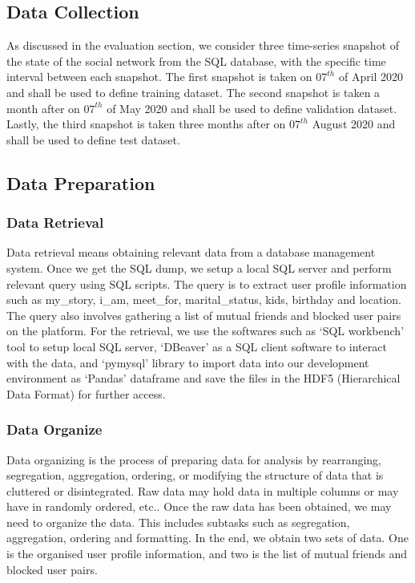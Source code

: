 \documentclass{kththesis}
\begin{document}
\subsection{Data Collection}
As discussed in the evaluation section, we consider three time-series snapshot of the state of the social network from the SQL database, with the specific time interval between each snapshot. The first snapshot is taken on $07^{th}$ of April 2020 and shall be used to define training dataset. The second snapshot is taken a month after on $07^{th}$ of May 2020 and shall be used to define validation dataset. Lastly, the third snapshot is taken three months after on $07^{th}$ August 2020 and shall be used to define test dataset.

\subsection{Data Preparation}
\subsubsection{Data Retrieval}
\noindent Data retrieval means obtaining relevant data from a database management system. Once we get the SQL dump, we setup a local SQL server and perform relevant query using SQL scripts. The query is to extract user profile information such as my\_story, i\_am, meet\_for, marital\_status, kids, birthday and location. The query also involves gathering a list of mutual friends and blocked user pairs on the platform. For the retrieval, we use the softwares such as `SQL workbench' tool to setup local SQL server, `DBeaver' as a SQL client software to interact with the data, and `pymysql' library to import data into our development environment as `Pandas' dataframe and save the files in the HDF5 (Hierarchical Data Format) for further access. 
\subsubsection{Data Organize}
\noindent Data organizing is the process of preparing data for analysis by rearranging, segregation, aggregation, ordering, or modifying the structure of data that is cluttered or disintegrated. Raw data may hold data in multiple columns or may have in randomly ordered, etc.. Once the raw data has been obtained, we may need to organize the data. This includes subtasks such as segregation, aggregation, ordering and formatting. In the end, we obtain two sets of data. One is the organised user profile information, and two is the list of mutual friends and blocked user pairs.
\end{document}
